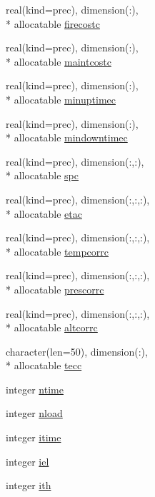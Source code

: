 \begin{DoxyCompactItemize}
real(kind=prec), dimension(\-:), \\*
allocatable \hyperlink{classinputvar_afa2d0c05087f3cda5d3e984037a2a354}{firecostc}
\item 
real(kind=prec), dimension(\-:), \\*
allocatable \hyperlink{classinputvar_a4371de15edf20ae9883b07b3b843655d}{maintcostc}
\item 
real(kind=prec), dimension(\-:), \\*
allocatable \hyperlink{classinputvar_a1c2a4cc32567b94cb7a884d3731bb5f4}{minuptimec}
\item 
real(kind=prec), dimension(\-:), \\*
allocatable \hyperlink{classinputvar_a9bb1424e04e5c89d561d2316045f98d4}{mindowntimec}
\item 
real(kind=prec), dimension(\-:,\-:), \\*
allocatable \hyperlink{classinputvar_a7a6b03a57941065017f0fe71a9d641f1}{spc}
\item 
real(kind=prec), dimension(\-:,\-:,\-:), \\*
allocatable \hyperlink{classinputvar_a3c6d7517ec3f9097a8d4264b50e61b48}{etac}
\item 
real(kind=prec), dimension(\-:,\-:,\-:), \\*
allocatable \hyperlink{classinputvar_a378a362979a22545cd843bbf687ca511}{tempcorrc}
\item 
real(kind=prec), dimension(\-:,\-:,\-:), \\*
allocatable \hyperlink{classinputvar_a4ad15e4562f67332a82dd70d6cfcb2fc}{prescorrc}
\item 
real(kind=prec), dimension(\-:,\-:,\-:), \\*
allocatable \hyperlink{classinputvar_a9fe000c19d0cd93b0e53d5d6b2cbc13f}{altcorrc}
\item 
character(len=50), dimension(\-:), \\*
allocatable \hyperlink{classinputvar_a2eb1c20cfae159c006e0fdc4b9ef0ef0}{tecc}
\item 
integer \hyperlink{classinputvar_a30d8dd7bcf1952df019939f8ad23b6e2}{ntime}
\item 
integer \hyperlink{classinputvar_ac924c0b7af6a3dbae99f1a60dc9242ab}{nload}
\item 
integer \hyperlink{classinputvar_a06f760a3ae10a8b9834a7e0d270d1d59}{itime}
\item 
integer \hyperlink{classinputvar_a6f9a3a8beea8f6e1aa8140bab654a48f}{iel}
\item 
integer \hyperlink{classinputvar_a4bba5fd8a8c399940c4b81e4da0cc9ce}{ith}

\end{DoxyCompactItemize}
